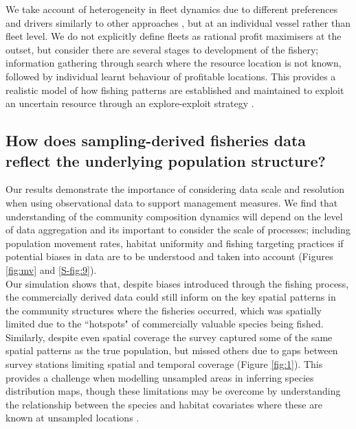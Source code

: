 \documentclass[preprint]{elsarticle}
\begin{document}
We take account of heterogeneity in fleet dynamics due to different preferences
and drivers similarly to other approaches \citep{Fulton2011}, but at an
individual vessel rather than fleet level. We do not explicitly define fleets
as rational profit maximisers at the outset, but consider there are several
stages to development of the fishery; information gathering through search
where the resource location is not known, followed by individual learnt
behaviour of profitable locations. This provides a realistic model of how
fishing patterns are established and maintained to exploit an uncertain
resource through an explore-exploit strategy \citep{Mangel1983, Bailey2018}. 

\subsection{How does sampling-derived fisheries data reflect the underlying
	population structure?}


Our results demonstrate the importance of considering data scale and resolution
when using observational data to support management measures. We find that
understanding of the community composition dynamics will depend on the level of
data aggregation and its important to consider the scale of processes;
including population movement rates, habitat uniformity and fishing targeting
practices if potential biases in data are to be understood and taken into
account (Figures \ref{fig:mv} and \ref{S-fig:9}). \\

Our simulation shows that, despite biases introduced through the fishing
process, the commercially derived data could still inform on the key spatial
patterns in the community structures where the fisheries occurred, which was
spatially limited due to the ``hotspots" of commercially valuable species being
fished. Similarly, despite even spatial coverage the survey captured some of
the same spatial patterns as the true population, but missed others due to gaps
between survey stations limiting spatial and temporal coverage (Figure
\ref{fig:1}). This provides a challenge when modelling unsampled areas in
inferring species distribution maps, though these limitations may be overcome
by understanding the relationship between the species and habitat covariates
where these are known at unsampled locations \citep{Robinson2011}. \\ 

\end{document}
